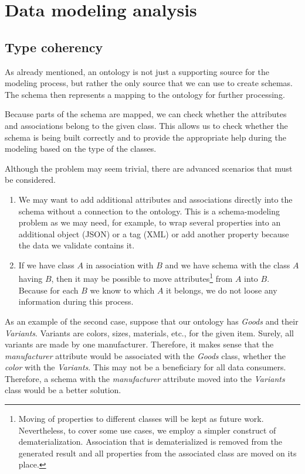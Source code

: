 \section{Data modeling analysis}

\subsection{Type coherency}\label{subsection:type-coherency}

As already mentioned, an ontology is not just a supporting source for the modeling process, but rather the only source that we can use to create schemas. The schema then represents a mapping to the ontology for further processing.

Because parts of the schema are mapped, we can check whether the attributes and associations belong to the given class. This allows us to check whether the schema is being built correctly and to provide the appropriate help during the modeling based on the type of the classes.

Although the problem may seem trivial, there are advanced scenarios that must be considered.

\begin{enumerate}
  \item We may want to add additional attributes and associations directly into the schema without a connection to the ontology. This is a schema-modeling problem as we may need, for example, to wrap several properties into an additional object (JSON) or a tag (XML) or add another property because the data we validate contains it.
  \item If we have class $A$ in association with $B$ and we have schema with the class $A$ having $B$, then it may be possible to move attributes\footnote{Moving of properties to different classes will be kept as future work. Nevertheless, to cover some use cases, we employ a simpler construct of dematerialization. Association that is dematerialized is removed from the generated result and all properties from the associated class are moved on its place.} from $A$ into $B$. Because for each $B$ we know to which $A$ it belongs, we do not loose any information during this process.
\end{enumerate}

As an example of the second case, suppose that our ontology has \textit{Goods} and their \textit{Variants}. Variants are colors, sizes, materials, etc., for the given item. Surely, all variants are made by one manufacturer. Therefore, it makes sense that the \textit{manufacturer} attribute would be associated with the \textit{Goods} class, whether the \textit{color} with the \textit{Variants}. This may not be a beneficiary for all data consumers. Therefore, a schema with the \textit{manufacturer} attribute moved into the \textit{Variants} class would be a better solution.

